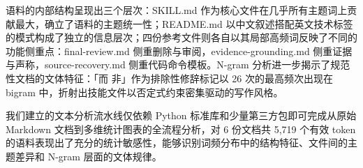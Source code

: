 \documentclass[12pt,a4paper]{ctexart}
\begin{document}
语料的内部结构呈现出三个层次：SKILL.md 作为核心文件在几乎所有主题词上贡献最大，确立了语料的主题统一性；README.md 以中文叙述搭配英文技术标签的模式构成了独立的信息层次；四份参考文件则各自以其局部高频词反映了不同的功能侧重点：final-review.md 侧重删除与审阅，evidence-grounding.md 侧重证据与声称，source-recovery.md 侧重代码命令模板。N-gram 分析进一步揭示了规范性文档的文体特征：「而 非」作为排除性修辞标记以 26 次的最高频次出现在 bigram 中，折射出技能文件以否定式约束密集驱动的写作风格。

我们建立的文本分析流水线仅依赖 Python 标准库和少量第三方包即可完成从原始 Markdown 文档到多维统计图表的全流程分析，对 6 份文档共 5,719 个有效 token 的语料表现出了充分的统计敏感性，能够识别词频分布中的结构特征、文件间的主题差异和 N-gram 层面的文体规律。
\end{document}

